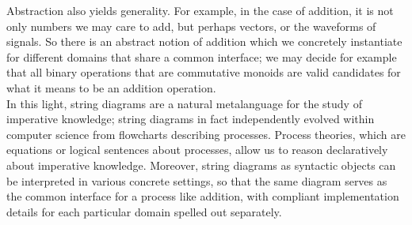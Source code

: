 Abstraction also yields generality. For example, in the case of addition, it is not only numbers we may care to add, but perhaps vectors, or the waveforms of signals. So there is an abstract notion of addition which we concretely instantiate for different domains that share a common interface; we may decide for example that all binary operations that are commutative monoids are valid candidates for what it means to be an addition operation.\\

In this light, string diagrams are a natural metalanguage for the study of imperative knowledge; string diagrams in fact independently evolved within computer science from flowcharts describing processes. Process theories, which are equations or logical sentences about processes, allow us to reason declaratively about imperative knowledge. Moreover, string diagrams as syntactic objects can be interpreted in various concrete settings, so that the same diagram serves as the common interface for a process like addition, with compliant implementation details for each particular domain spelled out separately.